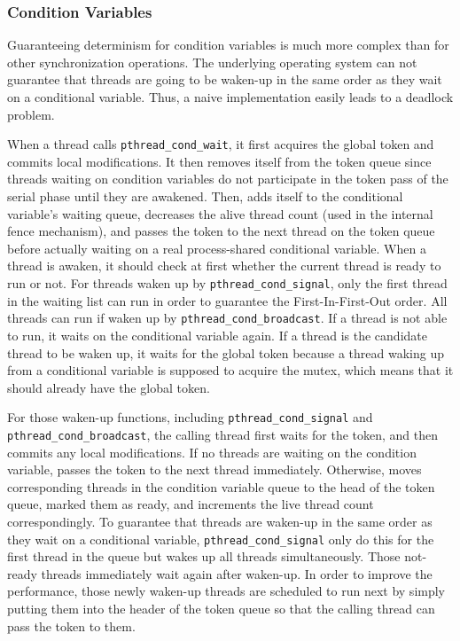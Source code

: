 \subsubsection{Condition Variables}
\label{sec:condwait}

Guaranteeing determinism for condition variables is much more complex than for other synchronization operations. The underlying operating system can not guarantee that threads are going to be waken-up in the same order as they wait on a conditional variable. Thus, a naive implementation easily leads to a deadlock problem.

When a thread calls \texttt{pthread\_cond\_wait}, it first acquires the global token and commits local modifications. It then removes itself from the token queue since threads waiting on condition variables do not participate in the token pass of the serial phase until they are awakened. Then, \dthreads{} adds itself to the conditional variable's waiting queue, decreases the alive thread count (used in the internal fence mechanism), and passes the token to the next thread on the token queue before actually waiting on a real process-shared conditional variable. When a thread is awaken, it should check at first whether the current thread is ready to run or not. For threads waken up by \texttt{pthread\_cond\_signal}, only the first thread in the waiting list can run in order to guarantee the First-In-First-Out order. All threads can run if waken up by \texttt{pthread\_cond\_broadcast}. If a thread is not able to run, it waits on the conditional variable again. If a thread is the candidate thread to be waken up, it waits for the global token because a thread waking up from a conditional variable is supposed to acquire the mutex, which means that it should already have the global token. 

For those waken-up functions, including \texttt{pthread\_cond\_signal} and \texttt{pthread\_cond\_broadcast}, the calling thread first waits for the token, and then commits any local modifications. If no threads are waiting on the condition variable, \dthreads{} passes the token to the next thread immediately. Otherwise, \dthreads{} moves corresponding threads in the condition variable queue to the head of the token queue, marked them as ready, and increments the live thread count correspondingly. To guarantee that threads are waken-up in the same order as they wait on a conditional variable, \texttt{pthread\_cond\_signal} only do this for the first thread in the queue but \dthreads{} wakes up all threads simultaneously. Those not-ready threads immediately wait again after waken-up. In order to improve the performance, those newly waken-up threads are scheduled to run next by simply putting them into the header of the token queue so that the calling thread can pass the token to them. 


